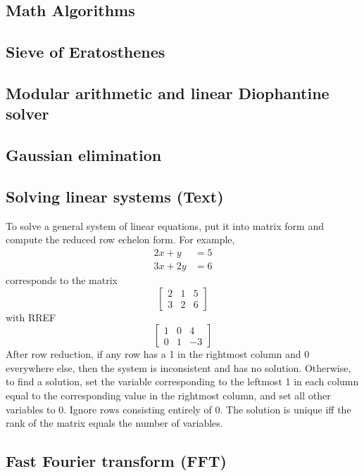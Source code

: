 \documentclass[12pt]{extarticle}
\begin{document}
\begin{multicols*}{3}
\section{Math Algorithms}

\subsection{Sieve of Eratosthenes} %


\subsection{Modular arithmetic and linear Diophantine solver} %


\subsection{Gaussian elimination} %



\subsection{Solving linear systems (Text)} %
To solve a general system of linear equations, put it into matrix form and
compute the reduced row echelon form. For example,
\begin{align*}2x + y &= 5 \\ 3x + 2y &= 6\end{align*}
corresponds to the matrix
\[ \left[ \begin{array}{cc|c} 2 & 1 & 5 \\ 3 & 2 & 6 \end{array} \right] \]
with RREF
\[ \left[ \begin{array}{cc|c} 1 & 0 & 4 \\ 0 & 1 & -3 \end{array} \right] \]
After row reduction, if any row has a 1 in the rightmost column and 0
everywhere else, then the system is inconsistent and has no solution.
Otherwise, to find a solution, set the variable corresponding to the leftmost 1
in each column equal to the corresponding value in the rightmost column, and
set all other variables to 0. Ignore rows consisting entirely of 0. The
solution is unique iff the rank of the matrix equals the number of variables.

\subsection{Fast Fourier transform (FFT)} %





\end{multicols*}
\end{document}
